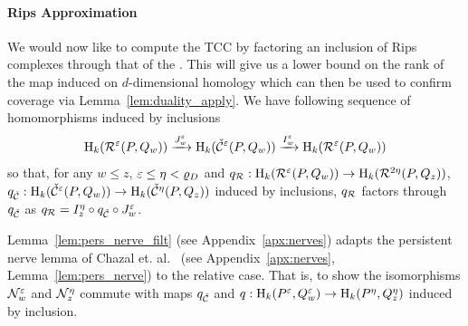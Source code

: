 \paragraph{Rips Approximation}

We would now like to compute the TCC by factoring an inclusion of Rips complexes through that of the \Cech.
This will give us a lower bound on the rank of the map induced on $d$-dimensional homology which can then be used to confirm coverage via Lemma~\ref{lem:duality_apply}.
We have following sequence of homomorphisms induced by inclusions
\[ \mathrm{H}_k(\mathcal{R}^\varepsilon(P, Q_w))\xrightarrow{J_w^\varepsilon}\mathrm{H}_k(\check{\mathcal{C}}^\varepsilon(P, Q_w))\xrightarrow{I_w^\varepsilon}\mathrm{H}_k(\mathcal{R}^\varepsilon(P, Q_w))\]
so that, for any $w\leq z$, $\varepsilon\leq\eta < \varrho_D$ and $q_{\mathcal{R}} : \mathrm{H}_k(\mathcal{R}^\varepsilon(P, Q_w))\to \mathrm{H}_k(\mathcal{R}^{2\eta}(P, Q_z))$, $q_{\check{\mathcal{C}}} : \mathrm{H}_k(\check{\mathcal{C}}^\varepsilon(P, Q_w))\to \mathrm{H}_k(\check{\mathcal{C}}^{\eta}(P, Q_z))$ induced by inclusions, $q_{\mathcal{R}}$ factors through $q_{\check{\mathcal{C}}}$ as $q_{\mathcal{R}} = I_z^\eta\circ q_{\check{\mathcal{C}}}\circ J_w^\varepsilon$.

Lemma~\ref{lem:pers_nerve_filt} (see Appendix~\ref{apx:nerves}) adapts the persistent nerve lemma of Chazal et. al.~\cite{chazal08towards} (see Appendix~\ref{apx:nerves}, Lemma~\ref{lem:pers_nerve}) to the relative case.
That is, to show the isomorphisms $\mathcal{N}_w^\varepsilon$ and $\mathcal{N}_z^\eta$ commute with maps $q_{\check{\mathcal{C}}}$ and $q : \mathrm{H}_k(P^\varepsilon, Q_w^\varepsilon)\to\mathrm{H}_k(P^\eta, Q_z^\eta)$  induced by inclusion.%


